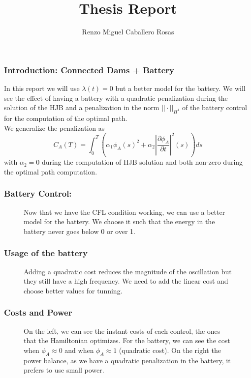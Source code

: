 \documentclass[aspectratio=169]{beamer}\usepackage[utf8]{inputenc}
\title{Thesis Report}
\subtitle{Renzo Miguel Caballero Rosas}
\begin{document}
\begin{frame}
\titlepage
\end{frame}

\begin{frame}\frametitle{Introduction: Connected Dams + Battery}
In this report we will use $\lambda(t)=0$ but a better model for the battery. We will see the effect of having a battery with a quadratic penalization during the solution of the HJB and a penalization in the norm $||\cdot||_{H^1}$ of the battery control for the computation of the optimal path.\\
We generalize the penalization as
\begin{equation*}
C_A(T)=\int_0^T\left(\alpha_1\phi_A(s)^2+\alpha_2\left|\frac{\partial\phi_A}{\partial t}\right|^2(s)\right)ds
\end{equation*}
with $\alpha_2=0$ during the computation of HJB solution and both non-zero during the optimal path computation.

\end{frame}

\begin{frame}\frametitle{Battery Control:}
\begin{figure}[ht!]
\centering
{}
\caption{Now that we have the CFL condition working, we can use a better model for the battery. We choose it such that the energy in the battery never goes below 0 or over 1.}
\end{figure}
\end{frame}

\begin{frame}\frametitle{Usage of the battery}
\begin{figure}[ht!]
\centering
{}
\caption{Adding a quadratic cost reduces the magnitude of the oscillation but they still have a high frequency. We need to add the linear cost and choose better values for tunning.}
\end{figure}
\end{frame}

\begin{frame}\frametitle{Costs and Power}
\begin{figure}[ht!]
\centering
{}
\caption{On the left, we can see the instant costs of each control, the ones that the Hamiltonian optimizes. For the battery, we can see the cost when $\phi_A\approx0$ and when $\phi_A\approx1$ (quadratic cost). On the right the power balance, as we have a quadratic penalization in the battery, it prefers to use small power.}
\end{figure}
\end{frame}
\end{document}
